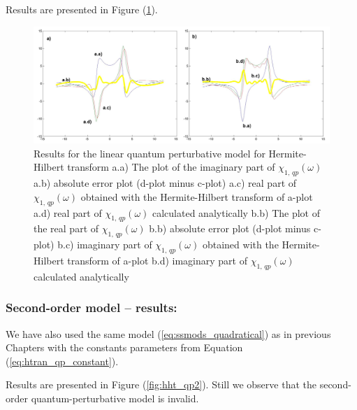 \documentclass[12pt,twoside,a4paper]{article}
\numberwithin{equation}{subsection}
\numberwithin{figure}{subsection}
\begin{document}
Results are presented in Figure (\ref{fig:hht_qp1}). 

\begin{figure}
  \includegraphics[width=150mm]{img/hht_qp1.png}
  \caption{Results for the linear quantum perturbative model for Hermite-Hilbert transform
    a.a) The plot of the imaginary part of ${\chi_{1, \,qp}}(\omega )$
    a.b) absolute error plot (d-plot minus c-plot) 
    a.c) real part of ${\chi_{1, \, qp}}(\omega )$ obtained with the Hermite-Hilbert transform of a-plot 
    a.d) real part of ${\chi_{1, \, qp}}(\omega )$ calculated analytically 
    b.b) The plot of the real part of ${\chi_{1, \, qp}}(\omega )$ 
    b.b) absolute error plot (d-plot minus c-plot) 
    b.c) imaginary part of ${\chi_{1, \, qp}}(\omega )$ obtained with the Hermite-Hilbert transform of a-plot 
    b.d) imaginary part of ${\chi_{1, \, qp}}(\omega )$ calculated analytically  
    \label{fig:hht_qp1}
  }
\end{figure}

\subsubsection*{Second-order model -- results:}

We have also used the same model (\ref{eq:ssmods_quadratical}) as in previous Chapters with the constants parameters from Equation (\ref{eq:htran_qp_constant}).

Results are presented in Figure (\ref{fig:hht_qp2}). Still we observe that the second\--order qu\-antum\--pertur\-bative model is invalid. 
\end{document}
